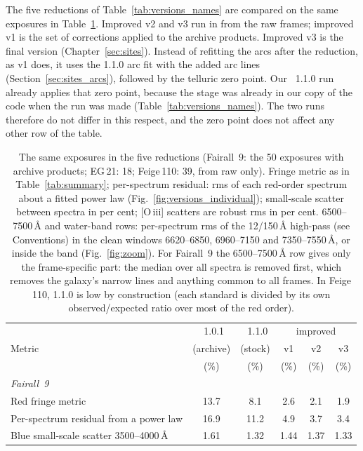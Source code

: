 The five reductions of Table~\ref{tab:versions_names} are compared on the same exposures in
Table~\ref{tab:versions}. Improved v2 and v3 run in \banzai{} from the raw frames; improved v1 is the set of
corrections applied to the archive products. Improved v3 is the final version (Chapter~\ref{sec:sites}). Instead of
refitting the arcs after the reduction, as v1 does, it uses the 1.1.0 arc fit with the added arc lines
(Section~\ref{sec:sites_arcs}), followed by the telluric zero point. Our \banzai{}~1.1.0 run already applies that zero
point, because the stage was already in our copy of the code when the run was made
(Table~\ref{tab:versions_names}). The two runs therefore do not differ in this respect, and the zero point does not
affect any other row of the table.

\begin{table}[!htbp]
\centering
\caption{The same exposures in the five reductions (Fairall~9: the 50 exposures with archive products; EG\,21: 18;
Feige\,110: 39, from raw only). Fringe metric as in Table~\ref{tab:summary}; per-spectrum residual: rms of each red-order spectrum about a fitted
power law (Fig.~\ref{fig:versions_individual}); small-scale scatter between spectra in per cent; [O\,{\sc iii}]
scatters are robust rms in per cent. 6500--7500\,\AA{} and water-band rows: per-spectrum rms of the 12/150\,\AA{}
high-pass (see Conventions) in the clean windows 6620--6850, 6960--7150 and 7350--7550\,\AA, or inside the band
(Fig.~\ref{fig:zoom}). For Fairall~9 the 6500--7500\,\AA{} row gives only the frame-specific part: the median over all
spectra is removed first, which removes the galaxy's narrow lines and anything common to all frames. In Feige\,110, 1.1.0 is low by
construction (each standard is divided by its own observed/expected ratio over most of the red order).}
\label{tab:versions}
\small
\begin{tabular}{lccccc}
\toprule
 & \banzai{}~1.0.1 & \banzai{}~1.1.0 & \multicolumn{3}{c}{improved} \\
Metric & (archive) & (stock) & v1 & v2 & v3 \\
 & (\%) & (\%) & (\%) & (\%) & (\%) \\
\midrule
\multicolumn{6}{l}{\textit{Fairall~9}}\\
Red fringe metric & 13.7 & 8.1 & 2.6 & 2.1 & 1.9 \\
Per-spectrum residual from a power law & 16.9 & 11.2 & 4.9 & 3.7 & 3.4 \\
Blue small-scale scatter 3500--4000\,\AA & 1.61 & 1.32 & 1.44 & 1.37 & 1.33 \\

\end{tabular}
\end{table}
